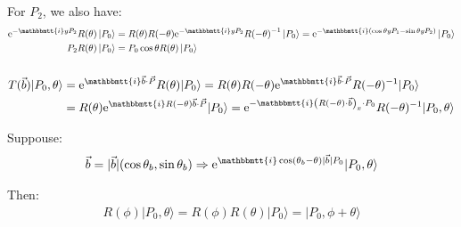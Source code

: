 \documentclass[]{ctexart}
\newcommand{\mi}{\mathbbmtt{i}}
\newcommand{\me}{\mathrm{e}}
\begin{document}
		For $P_2$, we also have:
			\begin{equation*}
			\begin{aligned}
				\me^{-\mi y P_{2}} R(\theta)\left|P_{0}\right\rangle&=R(\theta) R(-\theta) \me^{-\mi y P_{2}} R{(-\theta)}^{-1}\left|P_{0}\right\rangle=\me^{-\mi\left(\cos \theta y P_{1}-\sin \theta y P_{2}\right)}\left|P_{0}\right\rangle\\
				P_{2} R(\theta)\left|P_{0}\right\rangle&=P_{0} \cos \theta R(\theta)\left|P_{0}\right\rangle
			\end{aligned}
			\end{equation*}
			
	\subsubsection{}
		\begin{equation*}
		\begin{aligned}
			T(\vec{b})|P_0,\theta\rangle&=\me^{\mi\vec{b}\cdot\vec{P}}R(\theta)|P_0\rangle=R(\theta)R(-\theta)\me^{\mi\vec{b}\cdot\vec{P}}R(-\theta)^{-1}|P_0\rangle\\
			&=R(\theta)\me ^{\mi R(-\theta)\vec{b}\cdot\vec{P}}|P_0\rangle=\me^{-\mi \left(R(-\theta)\cdot\vec{b}\right)_x\cdot P_0}R(-\theta)^{-1}|P_0,\theta\rangle
		\end{aligned}
		\end{equation*}
	
	Suppouse:
		\begin{equation*}
		\begin{aligned}
			\vec{b}=|\vec{b}|(\cos\theta_b,\sin\theta_b)\Rightarrow \me ^{\mi \cos(\theta_b-\theta)|\vec{b}|P_0}|P_0,\theta\rangle
		\end{aligned}
		\end{equation*}
	
	Then:
		\begin{equation*}
		\begin{aligned}
			R(\phi)|P_0,\theta\rangle=R(\phi)R(\theta)|P_0\rangle=|P_0,\phi+\theta\rangle
		\end{aligned}
		\end{equation*}
		
\end{document}
